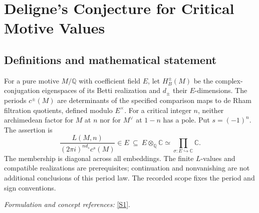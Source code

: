 \documentclass[11pt,a4paper]{article}
\numberwithin{equation}{section}
\newcommand{\Q}{\mathbb{Q}}
\newcommand{\C}{\mathbb{C}}
\newcommand{\sref}[2]{\hyperlink{source:#1:#2}{[S#2]}}
\newif\ifshowcatalogue
\newcommand{\cataloguescope}[1]{\ifshowcatalogue
 \paragraph{Exact scope in the supplied catalogue.}
 \begin{quote}\small #1\end{quote}\fi}
\begin{document}
\setcounter{section}{0}
\section*{\texorpdfstring{Deligne's Conjecture for Critical Motive Values}{Deligne's Conjecture for Critical Motive Values}}\label{30002589}
\subsection{Definitions and mathematical statement}
For a pure motive $M/\Q$ with coefficient field $E$, let $H_B^\pm(M)$ be the complex-conjugation eigenspaces of its Betti realization and $d_\pm$ their $E$-dimensions. The periods $c^\pm(M)$ are determinants of the specified comparison maps to de Rham filtration quotients, defined modulo $E^\times$. For a critical integer $n$, neither archimedean factor for $M$ at $n$ nor for $M^\vee$ at $1-n$ has a pole. Put $s=(-1)^n$. The assertion is
\[
 \frac{L(M,n)}{(2\pi i)^{n d_s}c^s(M)}\in E
 \ \subseteq\ E\otimes_{\Q}\C\simeq\prod_{\sigma:E\hookrightarrow\C}\C.
\]
The membership is diagonal across all embeddings. The finite $L$-values and compatible realizations are prerequisites; continuation and nonvanishing are not additional conclusions of this period law. The recorded scope fixes the period and sign conventions.
\par\smallskip\textit{Formulation and concept references:} \sref{30002589}{1}.
\cataloguescope{For every pure motive M over Q with coefficients in a number field E, in Deligne's geometric realization formalism (Betti, de Rham and compatible l-adic realizations with comparison, dual, tensor and Tate-twist structures), and every critical integer n, the normalized finite L-value vector L(M,n)/((2*pi*i)\textasciicircum{}(n*d\_sign)*c\textasciicircum{}sign(M)) lies in the diagonal E inside E tensor C, where sign=(-1)\textasciicircum{}n and d\_sign=dim\_E H\_B\textasciicircum{}sign(M). Here H\_B\textasciicircum{}sign is the sign eigenspace of complex conjugation, and c\textasciicircum{}sign is the determinant of the Betti/de Rham comparison to the corresponding filtration quotient, computed in E-rational bases and defined modulo E-units as in Deligne1.7/2.6. Critical means that L\_infinity(sigma,M,s) and L\_infinity(sigma,Mdual,1-s) have no pole at s=n for every embedding sigma:E->C (equivalently use Mdual(1) at -s). Use finite, not completed, L-functions with the compatible E-valued local factors of2.2. Analytic continuation giving finite values at the selected critical integer and the source's well-defined compatible realizations/local factors are defining prerequisites, not assertions proved by this period law and not a restriction to cases whose continuation is already known. The simultaneous embedding vector must come from one element of E; unrelated componentwise algebraicity is insufficient. All-zero values are allowed, but mixed zero/nonzero components do not satisfy the diagonal membership. No general nonvanishing or order-of-zero assertion from Deligne2.7 is appended.}
\end{document}
